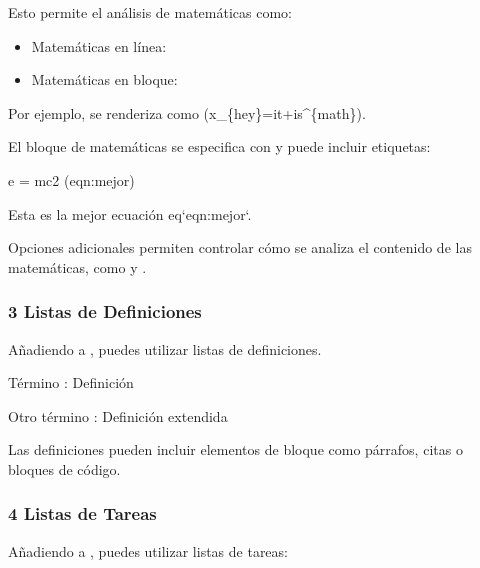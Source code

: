 \documentclass[a4paper,10pt,spanish]{sphinxmanual}
\begin{document}
\sphinxAtStartPar
Esto permite el análisis de matemáticas como:
\begin{itemize}
\item {} 
\sphinxAtStartPar
Matemáticas en línea: 

\item {} 
\sphinxAtStartPar
Matemáticas en bloque: 

\end{itemize}

\sphinxAtStartPar
Por ejemplo,  se renderiza como (x\_\{hey\}=it+is\textasciicircum{}\{math\}).

\sphinxAtStartPar
El bloque de matemáticas se especifica con \sphinxcode{\sphinxupquote{\$\$}} y puede incluir etiquetas:

\begin{sphinxVerbatim}[commandchars=\\\{\}]
\PYGZdl{}\PYGZdl{}
e = mc\PYGZca{}2
\PYGZdl{}\PYGZdl{} (eqn:mejor)

Esta es la mejor ecuación \PYGZob{}eq\PYGZcb{}`eqn:mejor`.
\end{sphinxVerbatim}

\sphinxAtStartPar
Opciones adicionales permiten controlar cómo se analiza el contenido de las matemáticas, como  y .


\subsubsection{3 Listas de Definiciones}
\label{\detokenize{configuracion_inicial/013.guia_de_myst_parser:listas-de-definiciones}}
\sphinxAtStartPar
Añadiendo  a , puedes utilizar listas de definiciones.

\begin{sphinxVerbatim}[commandchars=\\\{\}]
Término
: Definición

Otro término
: Definición extendida
\end{sphinxVerbatim}

\sphinxAtStartPar
Las definiciones pueden incluir elementos de bloque como párrafos, citas o bloques de código.


\subsubsection{4 Listas de Tareas}
\label{\detokenize{configuracion_inicial/013.guia_de_myst_parser:listas-de-tareas}}
\sphinxAtStartPar
Añadiendo  a , puedes utilizar listas de tareas:
\end{document}
